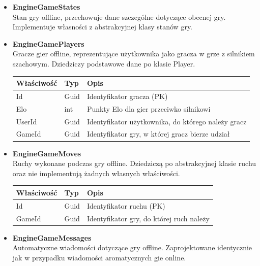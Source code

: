 \documentclass[12pt,a4paper]{article}
\begin{document}
\begin{itemize}
    \item \textbf{EngineGameStates}\\
    Stan gry offline, przechowuje dane szczególne dotyczące obecnej gry. Implementuje własności z abstrakcyjnej klasy stanów gry.

    \item \textbf{EngineGamePlayers}\\
    Gracze gier offline, reprezentujące użytkownika jako gracza w grze z silnikiem szachowym. Dziedziczy podstawowe dane po klasie Player.
    \renewcommand{\arraystretch}{1.5}
    \begin{longtable}{|m{4cm}|m{2cm}|m{8cm}|}
        \hline
        \rowcolor{lightgray}
        \textbf{Właściwość} & \textbf{Typ} & \textbf{Opis} \\ \hline
        \endhead
        \hline
        Id & Guid & Identyfikator gracza (PK) \\ \hline
        Elo & int & Punkty Elo dla gier przeciwko silnikowi \\ \hline
        UserId & Guid & Identyfikator użytkownika, do którego należy gracz \\ \hline
        GameId & Guid & Identyfikator gry, w której gracz bierze udział \\ \hline
    \end{longtable}
    
    \item \textbf{EngineGameMoves}\\
    Ruchy wykonane podczas gry offline. Dziedziczą po abstrakcyjnej klasie ruchu oraz nie implementują żadnych własnych właściwości.
    \renewcommand{\arraystretch}{1.5}
    \begin{longtable}{|m{4cm}|m{2cm}|m{8cm}|}
        \hline
        \rowcolor{lightgray}
        \textbf{Właściwość} & \textbf{Typ} & \textbf{Opis} \\ \hline
        \endhead
        \hline
        Id & Guid & Identyfikator ruchu (PK) \\ \hline
        GameId & Guid & Identyfikator gry, do której ruch należy \\ \hline
    \end{longtable}
    
    \item \textbf{EngineGameMessages}\\
    Automatyczne wiadomości dotyczące gry offline. Zaprojektowane identycznie jak w przypadku wiadomości aromatycznych gie online.
    
\end{itemize}
\end{document}
